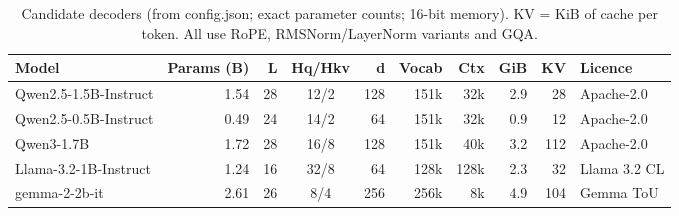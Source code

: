 \begin{table}[t]
\centering
\footnotesize
\caption{Candidate decoders (from config.json; exact parameter counts; 16-bit memory). KV = KiB of cache per token. All use RoPE, RMSNorm/LayerNorm variants and GQA.}
\label{tab:candidates}
\begin{tabular}{lrrcrrrrrl}
\toprule
Model & Params (B) & L & Hq/Hkv & d & Vocab & Ctx & GiB & KV & Licence \\
\midrule
Qwen2.5-1.5B-Instruct & 1.54 & 28 & 12/2 & 128 & 151k & 32k & 2.9 & 28 & Apache-2.0 \\
Qwen2.5-0.5B-Instruct & 0.49 & 24 & 14/2 & 64 & 151k & 32k & 0.9 & 12 & Apache-2.0 \\
Qwen3-1.7B & 1.72 & 28 & 16/8 & 128 & 151k & 40k & 3.2 & 112 & Apache-2.0 \\
Llama-3.2-1B-Instruct & 1.24 & 16 & 32/8 & 64 & 128k & 128k & 2.3 & 32 & Llama 3.2 CL \\
gemma-2-2b-it & 2.61 & 26 & 8/4 & 256 & 256k & 8k & 4.9 & 104 & Gemma ToU \\
\bottomrule
\end{tabular}
\end{table}
